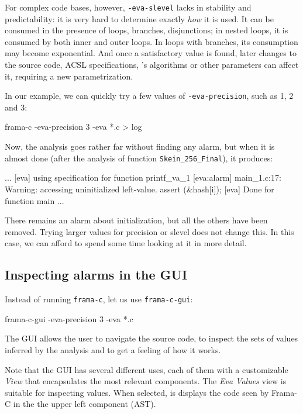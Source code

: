 \documentclass{frama-c-book}
\begin{document}
For complex code bases, however, \verb|-eva-slevel| lacks in stability and
predictability: it is very hard to determine exactly {\em how} it is used.
It can be consumed in the presence of loops, branches, disjunctions;
in nested loops, it is consumed by both inner and outer loops.
In loops with branches, its consumption may become exponential.
And once a satisfactory value is found, later changes to the source code,
ACSL specifications, \Eva{}'s algorithms or other parameters can affect it,
requiring a new parametrization.

In our example, we can quickly try a few values of \verb|-eva-precision|,
such as 1, 2 and 3:

\begin{frama-c-commands}
frama-c -eva-precision 3 -eva *.c > log
\end{frama-c-commands}

Now, the analysis goes rather far without finding any alarm,
but when it is almost done (after the analysis of function
\lstinline|Skein_256_Final|), it produces:
\begin{logsmath}
...
[eva] using specification for function printf_va_1
[eva:alarm] main_1.c:17: Warning:
  accessing uninitialized left-value. assert \initialized(&hash[i]);
[eva] Done for function main
...
\end{logsmath}

There remains an alarm about initialization, but all the others have been
removed. Trying larger values for precision or slevel does not change this.
In this case, we can afford to spend some time looking at it in more detail.

\subsection{Inspecting alarms in the GUI}

Instead of running \verb|frama-c|, let us use \verb|frama-c-gui|:

\begin{frama-c-commands}
frama-c-gui -eva-precision 3 -eva *.c
\end{frama-c-commands}

The GUI allows the user to navigate the source code, to inspect the sets of
values inferred by the analysis and to get
a feeling of how it works.

Note that the GUI has several different uses, each of them with a customizable
{\em View} that encapsulates the most relevant components. The {\em Eva Values}
view is suitable for inspecting values. When selected, is displays the code
seen by Frama-C in the the upper left component (AST).
\end{document}
